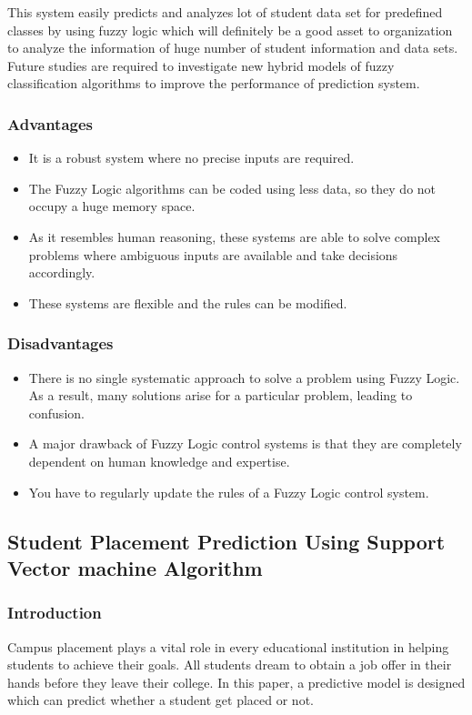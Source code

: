 \documentclass[12pt]{article}
\begin{document}
This system easily predicts and analyzes lot of student data set 
for predefined classes by using fuzzy logic which will definitely 
be a good asset to organization to analyze the information of huge 
number of student information and data sets. Future studies are 
required to investigate new hybrid models of fuzzy classification 
algorithms to improve the performance of prediction system.

\newpage
\subsubsection{Advantages}
\begin{itemize}
\item It is a robust system where no precise inputs are required.
\item The Fuzzy Logic algorithms can be coded using less data, so they do not occupy a huge memory space.
\item As it resembles human reasoning, these systems are able to solve complex problems where ambiguous inputs are available and take decisions accordingly.
\item These systems are flexible and the rules can be modified.
\end{itemize}
\vspace{10px}
\subsubsection{Disadvantages}
\begin{itemize}
\item There is no single systematic approach to solve a problem using Fuzzy Logic. As a result, many solutions arise for a particular problem, leading to confusion.
\item A major drawback of Fuzzy Logic control systems is that they are completely dependent on human knowledge and expertise.
\item You have to regularly update the rules of a Fuzzy Logic control system.
\end{itemize}


\newpage
\subsection{Student Placement Prediction Using Support Vector machine Algorithm}
\subsubsection{Introduction}
Campus placement plays a vital role in every educational institution in helping students to achieve their goals.
All students dream to obtain a job offer in their hands before they leave their college. In this paper, a predictive model is 
designed which can predict whether a student get placed or not. 
\end{document}
